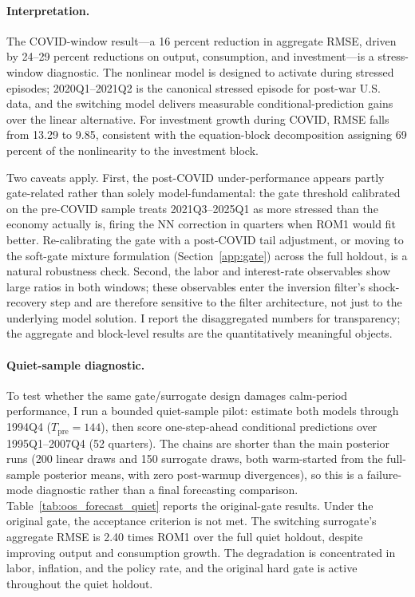 \documentclass[12pt]{article}
\theoremstyle{plain}
\theoremstyle{definition}
\theoremstyle{remark}
\begin{document}
\paragraph{Interpretation.} The COVID-window result---a 16 percent reduction in aggregate RMSE, driven by 24--29 percent reductions on output, consumption, and investment---is a stress-window diagnostic. The nonlinear model is designed to activate during stressed episodes; 2020Q1--2021Q2 is the canonical stressed episode for post-war U.S. data, and the switching model delivers measurable conditional-prediction gains over the linear alternative. For investment growth during COVID, RMSE falls from 13.29 to 9.85, consistent with the equation-block decomposition assigning 69 percent of the nonlinearity to the investment block.

Two caveats apply. First, the post-COVID under-performance appears partly gate-related rather than solely model-fundamental: the gate threshold calibrated on the pre-COVID sample treats 2021Q3--2025Q1 as more stressed than the economy actually is, firing the NN correction in quarters when ROM1 would fit better. Re-calibrating the gate with a post-COVID tail adjustment, or moving to the soft-gate mixture formulation (Section~\ref{app:gate}) across the full holdout, is a natural robustness check. Second, the labor and interest-rate observables show large ratios in both windows; these observables enter the inversion filter's shock-recovery step and are therefore sensitive to the filter architecture, not just to the underlying model solution. I report the disaggregated numbers for transparency; the aggregate and block-level results are the quantitatively meaningful objects.

\paragraph{Quiet-sample diagnostic.} To test whether the same gate/surrogate design damages calm-period performance, I run a bounded quiet-sample pilot: estimate both models through 1994Q4 ($T_{\text{pre}} = 144$), then score one-step-ahead conditional predictions over 1995Q1--2007Q4 (52 quarters). The chains are shorter than the main posterior runs (200 linear draws and 150 surrogate draws, both warm-started from the full-sample posterior means, with zero post-warmup divergences), so this is a failure-mode diagnostic rather than a final forecasting comparison. Table~\ref{tab:oos_forecast_quiet} reports the original-gate results. Under the original gate, the acceptance criterion is not met. The switching surrogate's aggregate RMSE is 2.40 times ROM1 over the full quiet holdout, despite improving output and consumption growth. The degradation is concentrated in labor, inflation, and the policy rate, and the original hard gate is active throughout the quiet holdout.
\end{document}
